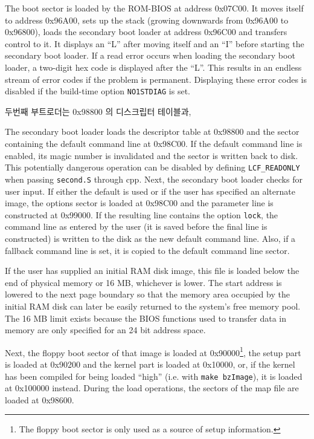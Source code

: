 \documentclass[fullpage]{article}
\begin{document}
The boot sector is loaded by the ROM-BIOS at address 0x07C00. It moves
itself to address 0x96A00, sets up the stack (growing downwards from
0x96A00 to 0x96800), loads the secondary boot loader at address
0x96C00 and transfers control to it. It displays an ``L'' after moving
itself and an ``I'' before starting the secondary boot loader. If a read
error occurs when loading the secondary boot loader, a two-digit hex code
is displayed after the ``L''. This results in an endless stream of error
codes if the problem is permanent. Displaying these error codes is disabled
if the build-time option {\tt NO1STDIAG} is set.

두번째 부트로더는 0x98800 의 디스크립터 테이블과, 

The secondary boot loader loads the descriptor table at 0x98800 and the
sector containing the default command line at 0x98C00. If the default command
line is enabled, its magic number is invalidated and the sector is written
back to disk. This potentially dangerous operation can be disabled by defining
{\tt LCF\_READONLY} when passing {\tt second.S} through {\sf cpp}. Next, the
secondary boot loader checks
for user input. If either the default is used or if the user has specified
an alternate image, the options sector is loaded at 0x98C00 and the parameter
line is constructed at 0x99000. If the resulting line contains the option
\verb"lock", the command line as entered by the user (it is saved before
the final line is constructed) is written to the disk as the new default
command line. Also, if a fallback command line is set, it is copied to the
default command line sector.

If the user has supplied an initial RAM disk image, this file is loaded
below the end of physical memory or 16 MB, whichever is lower. The start
address is lowered to the next page boundary so that the memory area
occupied by the initial RAM disk can later be easily returned to the
system's free memory pool. The 16 MB limit exists because the BIOS
functions used to transfer data in memory are only specified for an 24 bit
address space.

Next, the floppy boot sector of that image is
loaded at 0x90000\footnote{The floppy boot sector is only used as a source of
setup information.},
the setup part is loaded at 0x90200 and
the kernel part is loaded at 0x10000, or, if the kernel has been compiled
for being loaded ``high'' (i.e. with {\tt make bzImage}), it is loaded
at 0x100000 instead. During the load operations, the sectors
of the map file are loaded at 0x98600.
\end{document}
